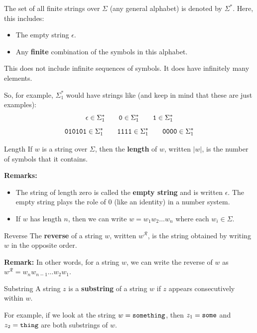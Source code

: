 \documentclass[letterpaper]{article}
\begin{document}
\bigskip

The set of all finite strings over $\Sigma$ (any general alphabet) is denoted by $\Sigma^*$. Here, this includes:
\begin{itemize}
    \item The empty string $\epsilon$.
    \item Any \textbf{finite} combination of the symbols in this alphabet.
\end{itemize}
This does not include infinite sequences of symbols. It does have infinitely many elements. 

\bigskip

So, for example, $\Sigma_{1}^{*}$ would have strings like (and keep in mind that these are just examples): 
\[\epsilon \in \Sigma_{1}^{*} \qquad \texttt{0} \in \Sigma_{1}^{*} \qquad \texttt{1} \in \Sigma_{1}^{*}\]
\[\texttt{010101} \in \Sigma_{1}^{*} \qquad \texttt{1111} \in \Sigma_{1}^{*} \qquad \texttt{0000} \in \Sigma_{1}^{*}\]

\begin{definition}{Length}{}
    If $w$ is a string over $\Sigma$, then the \textbf{length} of $w$, written $|w|$, is the number of symbols that it contains. 
\end{definition}
\textbf{Remarks:}
\begin{itemize}
    \item The string of length zero is called the \textbf{empty string} and is written $\epsilon$. The empty string plays the role of 0 (like an identity) in a number system.
    \item If $w$ has length $n$, then we can write $w = w_1 w_2 \dots w_n$ where each $w_i \in \Sigma$.
\end{itemize} 

\begin{definition}{Reverse}{}
    The \textbf{reverse} of a string $w$, written $w^{\mathcal{R}}$, is the string obtained by writing $w$ in the opposite order.
\end{definition}
\textbf{Remark:} In other words, for a string $w$, we can write the reverse of $w$ as $w^{\mathcal{R}} = w_n w_{n - 1} \dots w_{2} w_{1}$. 

\begin{definition}{Substring}{}
    A string $z$ is a \textbf{substring} of a string $w$ if $z$ appears consecutively within $w$.
\end{definition}
For example, if we look at the string $w = \texttt{something}$, then $z_1 = \texttt{some}$ and $z_2 = \texttt{thing}$ are both substrings of $w$. 
\end{document}

